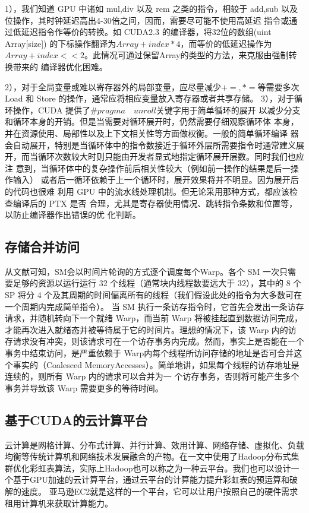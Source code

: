 1），我们知道 GPU 中诸如 mul,div 以及 rem 之类的指令，相较于
add,sub 以及位操作，其时钟延迟高出4-30倍之间，因而，需要尽可能不使用高延迟
指令或通过低延迟指令作等价的转换。如 CUDA2.3 的编译器，将32位的数组(uint
Array[size]) 的下标操作翻译为$Array+index*4$，而等价的低延迟操作为
$Array+index<<2$。此情况可通过保留Array的类型的方法，来克服由强制转换带来的
编译器优化困难。

2），对于全局变量或难以寄存器外的局部变量，应尽量减少$+=,*=$等需要多次
Load 和 Store 的操作，通常应将相应变量放入寄存器或者共享存储。
3），对于循环操作，CUDA 提供了$\#pragma \quad unroll$关键字用于简单循环的展开
以减少分支和循环本身的开销。但是当需要对循环展开时，仍然需要仔细观察循环体
本身，并在资源使用、局部性以及上下文相关性等方面做权衡。一般的简单循环编译
器会自动展开，特别是当循环体中的指令数接近于循环外层所需要指令时通常建义展
开，而当循环次数较大时则只能由开发者显式地指定循环展开层数。同时我们也应注
意到，当循环体中的复杂操作前后相关性较大（例如前一操作的结果是后一操作输入）
或者后一循环依赖于上一个循环时，展开效果将并不明显。因为展开后的代码也很难
利用 GPU 中的流水线处理机制。但无论采用那种方式，都应该检查编译后的 PTX 是否
合理，尤其是寄存器使用情况、跳转指令条数和位置等，以防止编译器作出错误的优
化判断。
\subsection{存储合并访问}
从文献\cite{cuda05}可知，SM会以时间片轮询的方式逐个调度每个Warp。各个 SM 一次只需要足够的资源以运行运行 32 个线程（通常块内线程数要远大于 32），其中的 8 个 SP 将分 4 个及其周期的时间偏离所有的线程（我们假设此处的指令为大多数可在一个周期内完成简单指令）。
当 SM 执行一条访存指令时，它首先会发出一条访存请求，并随机转向下一个就绪 Warp，而当前 Warp 将被挂起直到数据访问完成，才能再次进入就绪态并被等待属于它的时间片。理想的情况下，该 Warp 内的访存请求没有冲突，则该请求可在一个访存事务内完成。然而，事实上是否能在一个事务中结束访问，是严重依赖于 Warp内每个线程所访问存储的地址是否可合并这个事实的（Coalesced MemoryAccesses）。简单地讲，如果每个线程的访存地址是连续的，则所有 Warp 内的请求可以合并为一
个访存事务，否则将可能产生多个事务并导致该 Warp 需要更多的等待时间\cite{cuda02}。
\subsection{基于CUDA的云计算平台}
云计算是网格计算、分布式计算、并行计算、效用计算、网络存储、虚拟化、负载均衡等传统计算机和网络技术发展融合的产物。在\cite{word}一文中使用了Hadoop分布式集群优化彩虹表算法，实际上Hadoop也可以称之为一种云平台。我们也可以设计一个基于GPU加速的云计算平台，通过云平台的计算能力提升彩虹表的预运算和破解的速度。
亚马逊EC2就是这样的一个平台，它可以让用户按照自己的硬件需求租用计算机来获取计算能力。
